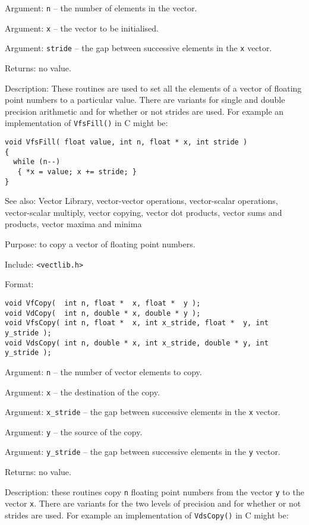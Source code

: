 Argument: {\tt n} -- the number of elements in the vector.

Argument: {\tt x} -- the vector to be initialised.

Argument: {\tt stride} -- the gap between successive elements in the
{\tt x} vector.

Returns: no value.

Description: These routines are used to set all the elements of a vector
of floating point numbers to a particular value. There are variants
for single and double precision arithmetic and for whether or not
strides are used. For example an
implementation of {\tt VfsFill()} in C might be:

\begin{verbatim}
void VfsFill( float value, int n, float * x, int stride )
{
  while (n--)
   { *x = value; x += stride; }
}
\end{verbatim}

See also: Vector Library, vector-vector operations, vector-scalar operations,
vector-scalar multiply, vector copying, vector dot products, vector sums and
products, vector maxima and minima

Purpose: to copy a vector of floating point numbers.

Include: \verb+<vectlib.h>+

Format:

\begin{verbatim}
void VfCopy(  int n, float *  x, float *  y );
void VdCopy(  int n, double * x, double * y );
void VfsCopy( int n, float *  x, int x_stride, float *  y, int y_stride );
void VdsCopy( int n, double * x, int x_stride, double * y, int y_stride );
\end{verbatim}

Argument: {\tt n} -- the number of vector elements to copy.

Argument: {\tt x} -- the destination of the copy.

Argument: \verb+x_stride+ -- the gap between successive elements in the
{\tt x} vector.

Argument: {\tt y} -- the source of the copy.

Argument: \verb+y_stride+ -- the gap between successive elements in the
{\tt y} vector.

Returns: no value.

Description: these routines copy {\tt n} floating point numbers from the
vector {\tt y} to the vector {\tt x}. There are variants for the two
levels of precision and for whether or not strides are used. For example
an implementation of {\tt VdsCopy()} in C might be:

